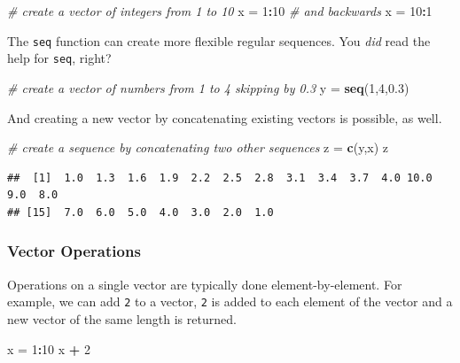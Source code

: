 \documentclass[]{article}
\newenvironment{Shaded}{\begin{snugshade}}{\end{snugshade}}
\newcommand{\KeywordTok}[1]{\textcolor[rgb]{0.13,0.29,0.53}{\textbf{#1}}}
\newcommand{\DecValTok}[1]{\textcolor[rgb]{0.00,0.00,0.81}{#1}}
\newcommand{\FloatTok}[1]{\textcolor[rgb]{0.00,0.00,0.81}{#1}}
\newcommand{\StringTok}[1]{\textcolor[rgb]{0.31,0.60,0.02}{#1}}
\newcommand{\CommentTok}[1]{\textcolor[rgb]{0.56,0.35,0.01}{\textit{#1}}}
\newcommand{\OperatorTok}[1]{\textcolor[rgb]{0.81,0.36,0.00}{\textbf{#1}}}
\newcommand{\NormalTok}[1]{#1}
\theoremstyle{definition}
\theoremstyle{definition}
\theoremstyle{remark}
\begin{document}
\begin{Shaded}
\begin{Highlighting}[]
\CommentTok{# create a vector of integers from 1 to 10}
\NormalTok{x =}\StringTok{ }\DecValTok{1}\OperatorTok{:}\DecValTok{10}
\CommentTok{# and backwards}
\NormalTok{x =}\StringTok{ }\DecValTok{10}\OperatorTok{:}\DecValTok{1}
\end{Highlighting}
\end{Shaded}

The \texttt{seq} function can create more flexible regular sequences.
You \emph{did} read the help for \texttt{seq}, right?

\begin{Shaded}
\begin{Highlighting}[]
\CommentTok{# create a vector of numbers from 1 to 4 skipping by 0.3}
\NormalTok{y =}\StringTok{ }\KeywordTok{seq}\NormalTok{(}\DecValTok{1}\NormalTok{,}\DecValTok{4}\NormalTok{,}\FloatTok{0.3}\NormalTok{)}
\end{Highlighting}
\end{Shaded}

And creating a new vector by concatenating existing vectors is possible,
as well.

\begin{Shaded}
\begin{Highlighting}[]
\CommentTok{# create a sequence by concatenating two other sequences}
\NormalTok{z =}\StringTok{ }\KeywordTok{c}\NormalTok{(y,x)}
\NormalTok{z}
\end{Highlighting}
\end{Shaded}

\begin{verbatim}
##  [1]  1.0  1.3  1.6  1.9  2.2  2.5  2.8  3.1  3.4  3.7  4.0 10.0  9.0  8.0
## [15]  7.0  6.0  5.0  4.0  3.0  2.0  1.0
\end{verbatim}

\subsubsection{Vector Operations}\label{vector-operations}

Operations on a single vector are typically done element-by-element. For
example, we can add \texttt{2} to a vector, \texttt{2} is added to each
element of the vector and a new vector of the same length is returned.

\begin{Shaded}
\begin{Highlighting}[]
\NormalTok{x =}\StringTok{ }\DecValTok{1}\OperatorTok{:}\DecValTok{10}
\NormalTok{x }\OperatorTok{+}\StringTok{ }\DecValTok{2}
\end{Highlighting}
\end{Shaded}
\end{document}
